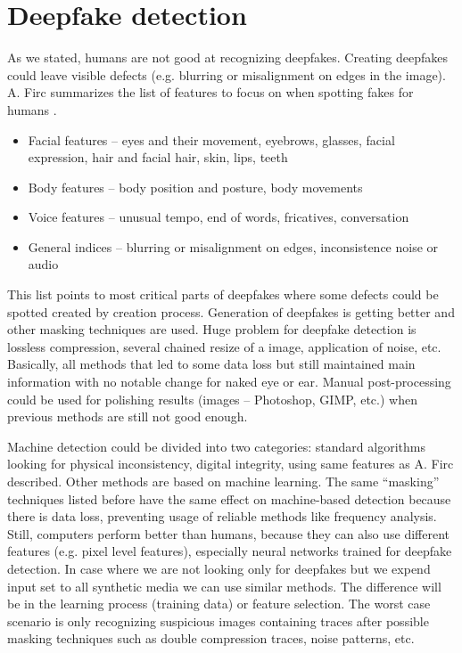 \chapter{Deepfake detection}
\label{chapter:deepfake_detectoin}

As we stated, humans are not good at recognizing deepfakes. Creating deepfakes could leave visible defects (e.g. blurring or misalignment on edges in the image). A. Firc summarizes the list of features to focus on when spotting fakes for humans \cite{ApplicabilityOfDeepfakes}.

\begin{itemize}
\item Facial features – eyes and their movement, eyebrows, glasses, facial expression, hair and facial hair, skin, lips, teeth
\item Body features – body position and posture, body movements
\item Voice features – unusual tempo, end of words, fricatives, conversation
\item General indices – blurring or misalignment on edges, inconsistence noise or audio
\end{itemize}
	
This list points to most critical parts of deepfakes where some defects could be spotted created by creation process. Generation of deepfakes is getting better and other masking techniques are used. Huge problem for deepfake detection is lossless compression, several chained resize of a image, application of noise, etc. Basically, all methods that led to some data loss but still maintained main information with no notable change for naked eye or ear.  Manual post-processing could be used for polishing results (images – Photoshop, GIMP, etc.) when previous methods are still not good enough.

Machine detection could be divided into two categories: standard algorithms looking for physical inconsistency, digital integrity, using same features as A. Firc described. Other methods are based on machine learning. The same “masking” techniques listed before have the same effect on machine-based detection because there is data loss, preventing usage of reliable methods like frequency analysis. Still, computers perform better than humans, because they can also use different features (e.g. pixel level features), especially neural networks trained for deepfake detection. In case where we are not looking only for deepfakes but we expend input set to all synthetic media we can use similar methods. The difference will be in the learning process (training data) or feature selection. The worst case scenario is only recognizing suspicious images containing traces after possible masking techniques such as double compression traces, noise patterns, etc. \cite{MediaForensicsandDeepFakes}

